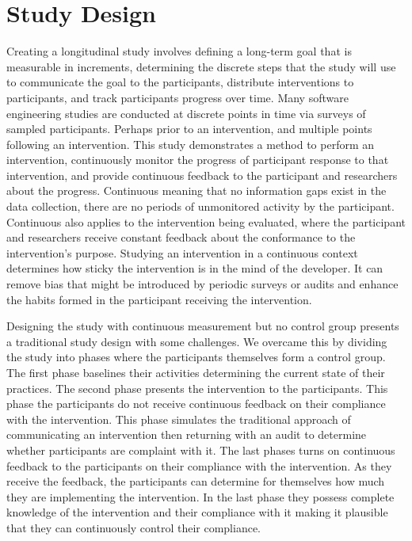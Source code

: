 \documentclass{sig-alternate}
\begin{document}
\section{Study Design}
Creating a longitudinal study involves defining a long-term goal that is measurable in increments, determining the discrete steps that the study will use to communicate the goal to the participants, distribute interventions to participants, and track participants progress over time.  Many software engineering studies are conducted at discrete points in time via surveys of sampled participants.  Perhaps prior to an intervention, and multiple points following an intervention.  This study demonstrates a method to perform an intervention, continuously monitor the progress of participant response to that intervention, and provide continuous feedback to the participant and researchers about the progress.  Continuous meaning that no information gaps exist in the data collection, there are no periods of unmonitored activity by the participant.  Continuous also applies to the intervention being evaluated, where the participant and researchers receive constant feedback about the conformance to the intervention's purpose.  Studying an intervention in a continuous context determines how sticky the intervention is in the mind of the developer.  It can remove bias that might be introduced by periodic surveys or audits and enhance the habits formed in the participant receiving the intervention.

Designing the study with continuous measurement but no control group presents a traditional study design with some challenges.  We overcame this by dividing the study into phases where the participants themselves form a control group.  The first phase baselines their activities determining the current state of their practices.  The second phase presents the intervention to the participants.  This phase the participants do not receive continuous feedback on their compliance with the intervention.  This phase simulates the traditional approach of communicating an intervention then returning with an audit to determine whether participants are complaint with it.   The last phases turns on continuous feedback to the participants on their compliance with the intervention.  As they receive the feedback, the participants can determine for themselves how much they are implementing the intervention.  In the last phase they possess complete knowledge of the intervention and their compliance with it making it plausible that they can continuously control their compliance.
\end{document}
